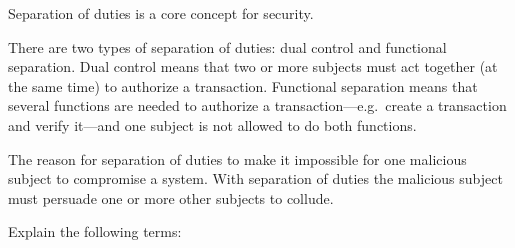 \documentclass[svv,addpoints]{miunexam}
\begin{document}
\begin{questions}


 
\question\label{q:accountability:E:C}
  Separation of duties is a core concept for security.

  \begin{solution}
    There are two types of separation of duties:
    dual control and functional separation.
    Dual control means that two or more subjects must act together (at the same 
    time) to authorize a transaction.
    Functional separation means that several functions are needed to authorize 
    a transaction---e.g.~create a transaction and verify it---and one subject 
    is not allowed to do both functions.

    The reason for separation of duties to make it impossible for one malicious 
    subject to compromise a system.
    With separation of duties the malicious subject must persuade one or more 
    other subjects to collude.
  \end{solution}


  
\question\label{q:crypto:foundations:E}
  Explain the following terms:
\end{questions}
\end{document}
